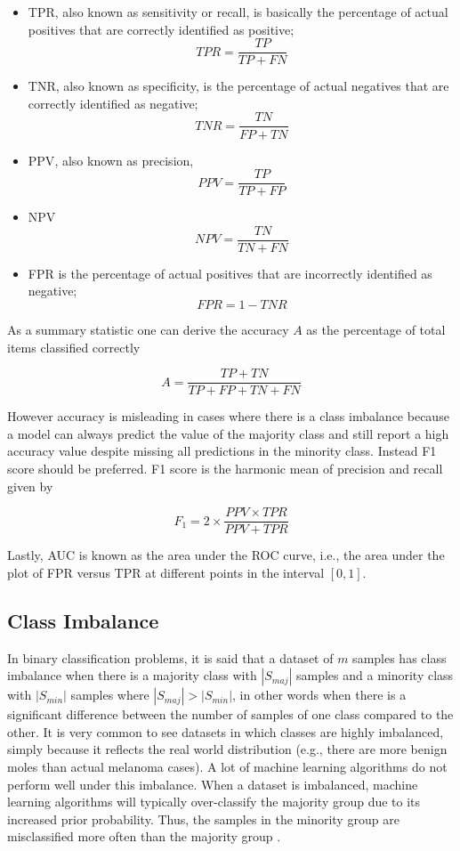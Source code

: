 \begin{itemize}
    \item \ac{TPR}, also known as sensitivity or recall, is basically the percentage of actual positives that are correctly identified as positive;
        $$TPR = \frac{TP}{TP + FN}$$
    \item \ac{TNR}, also known as specificity, is the percentage of actual negatives that are correctly identified as negative;
        $$TNR = \frac{TN}{FP + TN}$$
    \item \ac{PPV}, also known as precision,
        $$PPV = \frac{TP}{TP + FP}$$
    \item \ac{NPV}
        $$NPV = \frac{TN}{TN + FN}$$
    \item \ac{FPR} is the percentage of actual positives that are incorrectly identified as negative;
        $$FPR = 1 - TNR$$
\end{itemize}

As a summary statistic one can derive the accuracy $A$ as the percentage of total items classified correctly

$$
A = \frac{TP + TN}{TP + FP + TN + FN}
$$

However accuracy is misleading in cases where there is a class imbalance because a model can always predict the value of the majority class and still report a high accuracy value despite missing all predictions in the minority class. Instead F1 score should be preferred. F1 score is the harmonic mean of precision and recall given by

$$
F_1 = 2 \times \frac{PPV \times TPR}{PPV + TPR}
$$

Lastly, \ac{AUC} is known as the area under the \ac{ROC} curve, i.e., the area under the plot of \ac{FPR} versus \ac{TPR} at different points in the interval $[0, 1]$.

\subsection{Class Imbalance}

In binary classification problems, it is said that a dataset of $m$ samples has class imbalance when there is a majority class with $|S_{maj}|$ samples and a minority class with $|S_{min}|$ samples where $|S_{maj}| > |S_{min}|$, in other words when there is a significant difference between the number of samples of one class compared to the other. It is very common to see datasets in which classes are highly imbalanced, simply because it reflects the real world distribution (e.g., there are more benign moles than actual melanoma cases). A lot of machine learning algorithms do not perform well under this imbalance. When a dataset is imbalanced, machine learning algorithms will typically over-classify the majority group due to its increased prior probability. Thus, the samples in the minority group are misclassified more often than the majority group \cite{Johnson2019}.

